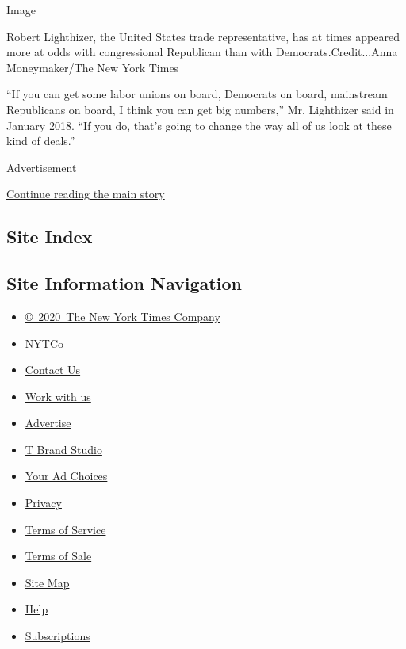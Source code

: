 Image

Robert Lighthizer, the United States trade representative, has at times
appeared more at odds with congressional Republican than with
Democrats.Credit...Anna Moneymaker/The New York Times

``If you can get some labor unions on board, Democrats on board,
mainstream Republicans on board, I think you can get big numbers,'' Mr.
Lighthizer said in January 2018. ``If you do, that's going to change the
way all of us look at these kind of deals.''

Advertisement

\protect\hyperlink{after-bottom}{Continue reading the main story}

\hypertarget{site-index}{%
\subsection{Site Index}\label{site-index}}

\hypertarget{site-information-navigation}{%
\subsection{Site Information
Navigation}\label{site-information-navigation}}

\begin{itemize}
\tightlist
\item
  \href{https://help.nytimes3xbfgragh.onion/hc/en-us/articles/115014792127-Copyright-notice}{©~2020~The
  New York Times Company}
\end{itemize}

\begin{itemize}
\tightlist
\item
  \href{https://www.nytco.com/}{NYTCo}
\item
  \href{https://help.nytimes3xbfgragh.onion/hc/en-us/articles/115015385887-Contact-Us}{Contact
  Us}
\item
  \href{https://www.nytco.com/careers/}{Work with us}
\item
  \href{https://nytmediakit.com/}{Advertise}
\item
  \href{http://www.tbrandstudio.com/}{T Brand Studio}
\item
  \href{https://www.nytimes3xbfgragh.onion/privacy/cookie-policy\#how-do-i-manage-trackers}{Your
  Ad Choices}
\item
  \href{https://www.nytimes3xbfgragh.onion/privacy}{Privacy}
\item
  \href{https://help.nytimes3xbfgragh.onion/hc/en-us/articles/115014893428-Terms-of-service}{Terms
  of Service}
\item
  \href{https://help.nytimes3xbfgragh.onion/hc/en-us/articles/115014893968-Terms-of-sale}{Terms
  of Sale}
\item
  \href{https://spiderbites.nytimes3xbfgragh.onion}{Site Map}
\item
  \href{https://help.nytimes3xbfgragh.onion/hc/en-us}{Help}
\item
  \href{https://www.nytimes3xbfgragh.onion/subscription?campaignId=37WXW}{Subscriptions}
\end{itemize}
